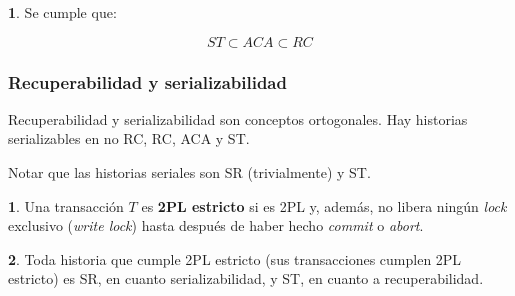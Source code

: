 \documentclass[english]{article}
\theoremstyle{definition}
\theoremstyle{definition}
\newtheorem*{defn*}{\protect\definitionname}
\providecommand{\definitionname}{Definición}
\newtheorem*{thm*}{\protect\theoremname}
\providecommand{\theoremname}{Teorema}
\begin{document}
\begin{thm*}
Se cumple que:

$$ ST \subset ACA \subset RC$$
\end{thm*}

\subsubsection{Recuperabilidad y serializabilidad}

Recuperabilidad y serializabilidad son conceptos ortogonales. Hay historias
serializables en no RC, RC, ACA y ST.

Notar que las historias seriales son SR (trivialmente) y ST.

\begin{defn*}
Una transacción $T$ es \textbf{2PL estricto} si es 2PL y, además, no libera
ningún \emph{lock} exclusivo (\emph{write lock}) hasta después de haber hecho
\emph{commit} o \emph{abort}.
\end{defn*}

\begin{thm*}
Toda historia que cumple 2PL estricto (sus transacciones cumplen 2PL estricto)
es SR, en cuanto serializabilidad, y ST, en cuanto a recuperabilidad.
\end{thm*}
\end{document}

